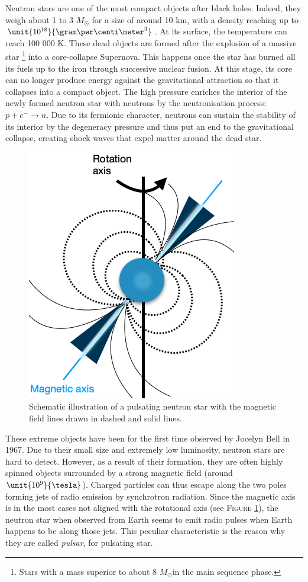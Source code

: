\documentclass[a4paper, twoside, 11pt]{article}
\numberwithin{equation}{section}
\begin{document}
 Neutron stars are one of the most compact objects after black holes. Indeed, they weigh about 1 to 3 $M_\odot$ for a size of around 10 km, with a density reaching up to $\unit{10^{18}}{\gram\per\centi\meter^3}$.  At its surface, the temperature can reach 100 000 K. 
These dead objects are formed after the explosion of a massive star \footnote{Stars with a mass superior to about 8 $M_\odot$in the main sequence phase.} into a core-collapse Supernova. This happens once the star has burned all its fuels up to the iron through successive nuclear fusion. At this stage, its core can no longer produce energy against the gravitational attraction so that it collapses into a compact object. The high pressure enriches the interior of the newly formed neutron star with neutrons by the neutronisation process: $p + e^- \longrightarrow n$. 
Due to its fermionic character, neutrons can sustain the stability of its interior by the degeneracy pressure and thus put an end to the gravitational collapse, creating shock waves that expel matter around the dead star.  \\
 \begin{figure}
\centering
  \includegraphics[width=0.3
  \textwidth]{pictures/pulsar.png}
  \caption[Illustration of a pulsar ]{Schematic illustration of a pulsating neutron star with the magnetic field lines drawn in dashed and solid lines. }
  \label{fig:pulsar}
\end{figure}
\indent These extreme objects have been for the first time observed by Jocelyn Bell in 1967. Due to their small size and extremely low luminosity, neutron stars are hard to detect. However, as a result of their formation, they are often highly spinned objects surrounded by a strong magnetic field (around $\unit{10^9}{\tesla}$). Charged particles can thus escape along the two poles forming jets of radio emission by synchrotron radiation. Since the magnetic axis is in the most cases not aligned with the rotational axis (see F\textsc{igure} \ref{fig:pulsar}), the neutron star when observed from {Earth} seems to emit radio pulses when {Earth} happens to be along those jets. {This} peculiar characteristic is the reason why they are called {\itshape{pulsar}}, for pulsating star. \\
\end{document}
